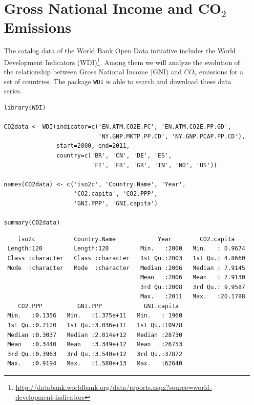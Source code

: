 \section{Gross National Income and CO\(_{\text{2}}\) Emissions}
\label{sec:org9ba3273}
The catalog data of the World Bank Open Data initiative includes the
World Development Indicators (WDI)\footnote{\url{http://databank.worldbank.org/data/reports.aspx?source=world-development-indicators}}. Among them we will analyze
the evolution of the relationship between Gross National Income (GNI)
and \(CO_2\) emissions for a set of countries. The package \texttt{WDI} is able
to search and download these data series.


\lstset{language=r,label= ,caption= ,captionpos=b,numbers=none}
\begin{lstlisting}
library(WDI)
    
CO2data <- WDI(indicator=c('EN.ATM.CO2E.PC', 'EN.ATM.CO2E.PP.GD',
                           'NY.GNP.MKTP.PP.CD', 'NY.GNP.PCAP.PP.CD'),
               start=2000, end=2011,
               country=c('BR', 'CN', 'DE', 'ES',
                         'FI', 'FR', 'GR', 'IN', 'NO', 'US'))

names(CO2data) <- c('iso2c', 'Country.Name', 'Year',
                    'CO2.capita', 'CO2.PPP',
                    'GNI.PPP', 'GNI.capita')

summary(CO2data)
\end{lstlisting}

\begin{verbatim}
    iso2c           Country.Name            Year        CO2.capita     
 Length:120         Length:120         Min.   :2000   Min.   : 0.9674  
 Class :character   Class :character   1st Qu.:2003   1st Qu.: 4.8660  
 Mode  :character   Mode  :character   Median :2006   Median : 7.9145  
                                       Mean   :2006   Mean   : 7.9130  
                                       3rd Qu.:2008   3rd Qu.: 9.9587  
                                       Max.   :2011   Max.   :20.1788  
    CO2.PPP          GNI.PPP            GNI.capita   
 Min.   :0.1356   Min.   :1.375e+11   Min.   : 1960  
 1st Qu.:0.2120   1st Qu.:3.036e+11   1st Qu.:10978  
 Median :0.3037   Median :2.014e+12   Median :28730  
 Mean   :0.3440   Mean   :3.349e+12   Mean   :26753  
 3rd Qu.:0.3963   3rd Qu.:3.540e+12   3rd Qu.:37872  
 Max.   :0.9194   Max.   :1.580e+13   Max.   :62640
\end{verbatim}


